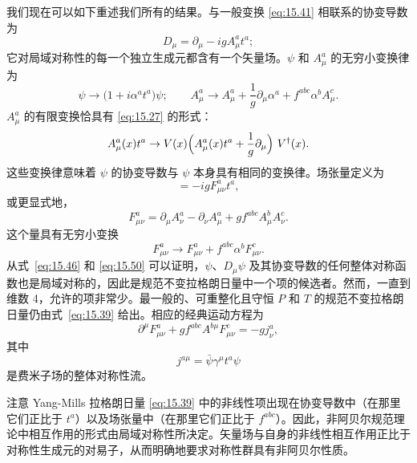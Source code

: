 我们现在可以如下重述我们所有的结果。与一般变换 \eqref{eq:15.41} 相联系的协变导数为
\begin{equation}
  D_\mu = \partial_\mu - igA_\mu^a t^a ;
  \label{eq:15.45}
\end{equation}
它对局域对称性的每一个独立生成元都含有一个矢量场。$\psi$ 和 $A_\mu^a$ 的无穷小变换律为
\begin{equation}
  \psi \to \bigl( 1 + i\alpha^a t^a \bigr)\psi;\qquad
  A_\mu^a \to A_\mu^a + \frac{1}{g}\partial_\mu\alpha^a
    + f^{abc}\alpha^b A_\mu^c .
  \label{eq:15.46}
\end{equation}
$A_\mu^a$ 的有限变换恰具有 \eqref{eq:15.27} 的形式：
\begin{equation}
  A_\mu^a(x)t^a \to V(x)\Bigl( A_\mu^a(x)t^a + \frac{1}{g}\partial_\mu
    \Bigr)\ V^{\dagger}(x) .
  \label{eq:15.47}
\end{equation}
这些变换律意味着 $\psi$ 的协变导数与 $\psi$ 本身具有相同的变换律。场张量定义为
\begin{equation}
  [D_\mu, D_\nu] = -igF^a_{\mu\nu}t^a ,
  \label{eq:15.48}
\end{equation}
或更显式地，
\begin{equation}
  F^a_{\mu\nu} = \partial_\mu A_\nu^a - \partial_\nu A_\mu^a
    + gf^{abc}A_\mu^b A_\nu^c .
  \label{eq:15.49}
\end{equation}
这个量具有无穷小变换
\begin{equation}
  F^a_{\mu\nu} \to F^a_{\mu\nu} + f^{abc}\alpha^b F^c_{\mu\nu} .
  \label{eq:15.50}
\end{equation}
从式~\eqref{eq:15.46} 和 \eqref{eq:15.50} 可以证明，$\psi$、$D_\mu\psi$ 及其协变导数的任何整体对称函数也是局域对称的，因此是规范不变拉格朗日量中一个项的候选者。然而，一直到维数 4，允许的项非常少。最一般的、可重整化且守恒 $P$ 和 $T$ 的规范不变拉格朗日量仍由式~\eqref{eq:15.39} 给出。相应的经典运动方程为
\begin{equation}
  \partial^\mu F^a_{\mu\nu} + gf^{abc}A^{b\mu}F^c_{\mu\nu} = -gj^a_\nu ,
  \label{eq:15.51}
\end{equation}
其中
\begin{equation}
  j^{a\mu} = \bar{\psi}\gamma^\mu t^a\psi
  \label{eq:15.52}
\end{equation}
是费米子场的整体对称性流。

注意 Yang-Mills 拉格朗日量 \eqref{eq:15.39} 中的非线性项出现在协变导数中（在那里它们正比于 $t^a$）以及场张量中（在那里它们正比于 $f^{abc}$）。因此，非阿贝尔规范理论中相互作用的形式由局域对称性所决定。矢量场与自身的非线性相互作用正比于对称性生成元的对易子，从而明确地要求对称性群具有非阿贝尔性质。

